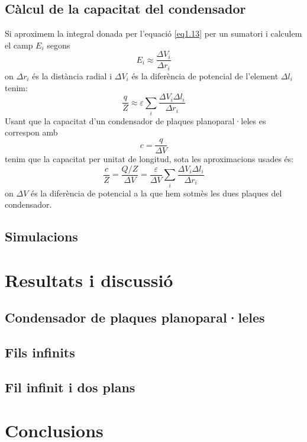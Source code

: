 \documentclass[a4paper,10.5pt]{report}
\begin{document}
	\subsection{Càlcul de la capacitat del condensador}
	Si aproximem la integral donada per l'equació \eqref{eq1.13} per un sumatori i calculem el camp $E_i$ segons
	\begin{equation}
		E_i \approx \frac{\Delta V_i}{\Delta r_i}
	\end{equation}
	on $\Delta r_i$ és la distància radial i $\Delta V_i$ és la diferència de potencial de l'element $\Delta l_i$ tenim:
	\begin{equation}
		\frac{q}{Z} \approx \varepsilon \sum_i \frac{\Delta V_i \Delta l_i}{\Delta r_i}
	\end{equation}
	Usant que la capacitat d'un condensador de plaques planoparal·leles es correspon amb 
	\begin{equation}
		c = \frac{q}{\Delta V}
	\end{equation}
	tenim que la capacitat per unitat de longitud, sota les aproximacions usades és:
	\begin{equation}
		\frac{c}{Z} = \frac{Q/Z}{\Delta V} = \frac{\varepsilon}{\Delta V} \sum_i \frac{\Delta V_i \Delta l_i}{\Delta r_i}  
	\end{equation}
	on $\Delta V$ és la diferència de potencial a la que hem sotmès les dues plaques del condensador.
	
	\subsection{Simulacions}
	\section{Resultats i discussió}
	
	\subsection{Condensador de plaques planoparal·leles}
	
	\subsection{Fils infinits}

	\subsection{Fil infinit i dos plans}
	
	\section{Conclusions}
	
\end{document}

